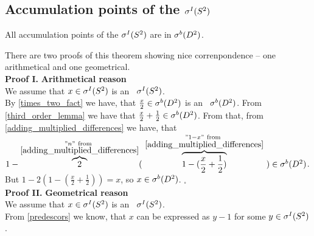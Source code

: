 \subsection{Accumulation points of the ${\mathcal{\sigma}^I(S^2)}$}
\begin{theorem}
All accumulation points of the ${\mathcal{\sigma}^I(S^2)}$ are in ${\mathcal{\sigma}^b(D^2)}$.
\end{theorem}
There are two proofs of this theorem showing nice correnpondence -- one arithmetical and 
one geometrical. 
\\
\textbf{Proof I.}
\textbf{Arithmetical reason} \\
We assume that $x \in {\mathcal{\sigma}^I(S^2)}$ is an \apots\ ${\mathcal{\sigma}^I(S^2)}$.\\
By \ref{times_two_fact} we have, that 
$\frac{x}{2} \in {\mathcal{\sigma}^b(D^2)}$ is an \apots\ ${\mathcal{\sigma}^b(D^2)}$. From \ref{third_order_lemma} we have that 
$\frac{x}{2} + \frac{1}{2} \in {\mathcal{\sigma}^b(D^2)}$. From that, from \ref{adding_multiplied_differences} we have, 
that $1-\overbrace{2}^{\substack{"n"\rm\ from\ \\ 
\rm \ref{adding_multiplied_differences}}} 
(\ \overbrace{1-(\frac{x}{2}+\frac{1}{2})}^{\substack{"1-x"\rm\ 
from\ \\ \rm \ref{adding_multiplied_differences}}}\ ) \in \sbD$. But $1 - 2(1-(\frac{x}{2}+
\frac{1}{2})) = x$, so $x \in {\mathcal{\sigma}^b(D^2)}$. $_\square$
\\[2pt]
\textbf{Proof II.}
\textbf{Geometrical reason} \\
We assume that $x \in {\mathcal{\sigma}^I(S^2)}$ is an \apots\ ${\mathcal{\sigma}^I(S^2)}$.\\
From \ref{predescors} we know, that $x$ can be expressed as $y - 1$ for some $y \in {\mathcal{\sigma}^I(S^2)}$. \\
